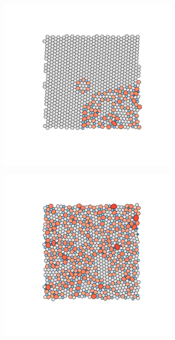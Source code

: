 \begin{figure}[p]
     \begin{subfigure}[b]{0.35\textwidth}
         \centering
         \includegraphics[width=\textwidth]{./figures/bilayers/mx2_sq_1.pdf}
         \caption{}
         \label{fig:triraft1}
     \end{subfigure}
     \hspace{1cm}
     \begin{subfigure}[b]{0.35\textwidth}
         \centering
         \includegraphics[width=\textwidth]{./figures/bilayers/mx2_sq_2.pdf}
         \caption{}
         \label{fig:triraft2}
     \end{subfigure}
     \hfill
     

\end{figure}
